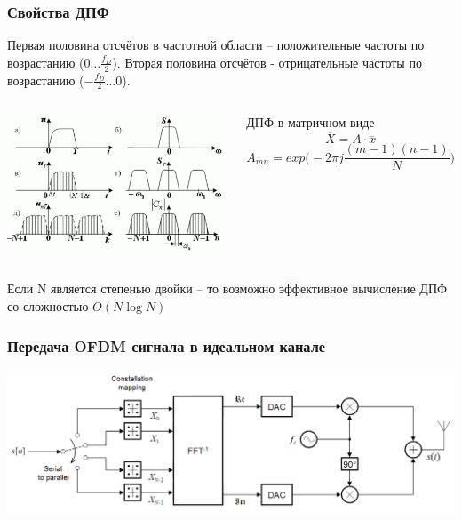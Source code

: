 \documentclass[utf8]{beamer}
\begin{document}
\begin{frame}
\frametitle{Свойства ДПФ}

Первая половина отсчётов в частотной области -- положительные частоты по возрастанию ($0 \ldots \frac{f_D}{2}$).
Вторая половина отсчётов - отрицательные частоты по возрастанию ($-\frac{f_D}{2}\ldots 0$).
\begin{columns}
\begin{block}{}
\centering
\includegraphics[width=\textwidth]{pic/dft.pdf}
\end{block}
\begin{block}{ДПФ в матричном виде}
$$
\overline{X} = A\cdot \overline{x}
$$
$$
A_{mn} =
exp \Big(
-2\pi j \frac{(m-1)(n - 1)}{N}
\Big)
$$
\end{block}
\end{columns}
Если N является степенью двойки -- то возможно эффективное вычисление ДПФ со сложностью $O (N \log N)$
\end{frame}
\begin{frame}
\frametitle{Передача  OFDM сигнала в идеальном канале}
\includegraphics[width=\textwidth]{pic/OFDM_transmitter_ideal.png}
\end{frame}
\end{document}
